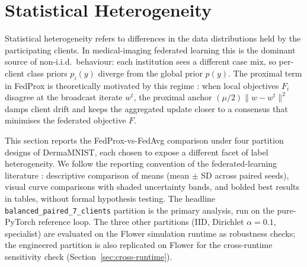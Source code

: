 %
%
%
%   

\section{Statistical Heterogeneity}
\label{sec:results-statistical-het}

Statistical heterogeneity refers to differences in the data
distributions held by the participating clients. In medical-imaging
federated learning this is the dominant source of non-i.i.d.\
behaviour: each institution sees a different case mix, so per-client
class priors $p_i(y)$ diverge from the global prior $p(y)$. The
proximal term in FedProx is theoretically motivated by this regime
\citep{li2020fedprox}: when local objectives $F_i$ disagree at the
broadcast iterate $w^t$, the proximal anchor
$(\mu/2)\lVert w - w^t \rVert^2$ damps client drift and keeps the
aggregated update closer to a consensus that minimises the federated
objective $F$.

This section reports the FedProx-vs-FedAvg comparison under four
partition designs of DermaMNIST, each chosen to expose a different
facet of label heterogeneity. We follow the reporting convention of
the federated-learning literature \citep{li2020fedprox, mcmahan2017fedavg,
wang2020fednova, hsu2019dirichlet}: descriptive comparison of means
(mean $\pm$ SD across paired seeds), visual curve comparisons with
shaded uncertainty bands, and bolded best results in tables, without
formal hypothesis testing. The headline
\texttt{balanced\_paired\_7\_clients} partition is the primary
analysis, run on the pure-PyTorch reference loop. The three other
partitions (IID, Dirichlet $\alpha = 0.1$, specialist) are evaluated
on the Flower simulation runtime as robustness checks; the engineered
partition is also replicated on Flower for the cross-runtime
sensitivity check (Section~\ref{sec:cross-runtime}).

